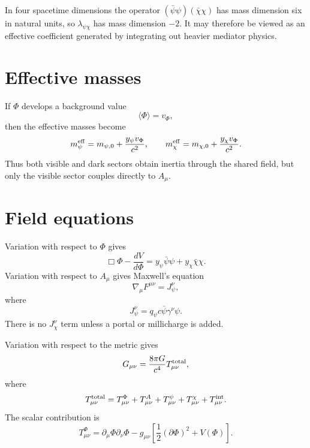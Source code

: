 \documentclass[11pt]{article}
\theoremstyle{remark}
\begin{document}
In four spacetime dimensions the operator $(\bar\psi\psi)(\bar\chi\chi)$ has mass dimension six in natural units, so $\lambda_{\psi\chi}$ has mass dimension $-2$. It may therefore be viewed as an effective coefficient generated by integrating out heavier mediator physics.


\section{Effective masses}
If $\Phi$ develops a background value
\begin{equation}
    \langle\Phi\rangle=v_\Phi,
\end{equation}
then the effective masses become
\begin{equation}
    m_\psi^{\rm eff}=m_{\psi,0}+\frac{y_\psi v_\Phi}{c^2},
    \qquad
    m_\chi^{\rm eff}=m_{\chi,0}+\frac{y_\chi v_\Phi}{c^2}.
\end{equation}
Thus both visible and dark sectors obtain inertia through the shared field, but only the visible sector couples directly to $A_\mu$.

\section{Field equations}
Variation with respect to $\Phi$ gives
\begin{equation}
    \Box\Phi-\frac{dV}{d\Phi}
    = y_\psi\bar\psi\psi+y_\chi\bar\chi\chi.
\end{equation}
Variation with respect to $A_\mu$ gives Maxwell's equation
\begin{equation}
    \nabla_\mu F^{\mu\nu}=J^\nu_\psi,
\end{equation}
where
\begin{equation}
    J^\nu_\psi=q_\psi c\bar\psi\gamma^\nu\psi.
\end{equation}
There is no $J^\nu_\chi$ term unless a portal or millicharge is added.

Variation with respect to the metric gives
\begin{equation}
    G_{\mu\nu}=\frac{8\pi G}{c^4}T^{\rm total}_{\mu\nu},
\end{equation}
where
\begin{equation}
    T^{\rm total}_{\mu\nu}=T^{\Phi}_{\mu\nu}+T^{A}_{\mu\nu}+T^{\psi}_{\mu\nu}+T^{\chi}_{\mu\nu}+T^{\rm int}_{\mu\nu}.
\end{equation}
The scalar contribution is
\begin{equation}
    T^{\Phi}_{\mu\nu}
    =\partial_\mu\Phi\partial_\nu\Phi
    -g_{\mu\nu}\left[\frac12(\partial\Phi)^2+V(\Phi)\right].
\end{equation}
\end{document}

